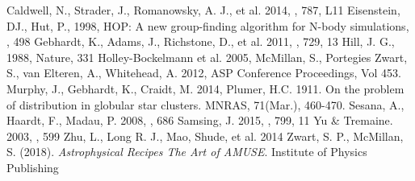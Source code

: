 \documentclass{aastex62}
\begin{document}
\begin{thebibliography}{}
Caldwell, N., Strader, J., Romanowsky, A. J., et al. 2014, \apjl, 787, L11
Eisenstein, DJ., Hut, P., 1998, HOP: A new group-finding algorithm for N-body simulations, \apj, 498
Gebhardt, K., Adams, J., Richstone, D., et al. 2011, \apj, 729, 13
Hill, J. G., 1988, Nature, 331
Holley-Bockelmann et al. 2005, \apjl
{}
McMillan, S., Portegies Zwart, S., van Elteren, A., Whitehead, A. 2012, ASP Conference Proceedings, Vol 453. 
Murphy, J., Gebhardt, K., Craidt, M. 2014, \apj
{}
Plumer, H.C. 1911. On the problem of distribution in globular star clusters. MNRAS, 71(Mar.), 460-470.
Sesana, A., Haardt, F., Madau, P. 2008, \apj, 686
Samsing, J. 2015, \apj, 799, 11
Yu \& Tremaine. 2003, \apj, 599
Zhu, L., Long R. J., Mao, Shude, et al. 2014 \apj
{}
Zwart, S. P., McMillan, S. (2018). \textit{Astrophysical Recipes The Art of AMUSE}. Institute of Physics Publishing
\end{thebibliography}
\end{document}
